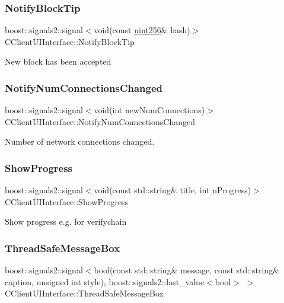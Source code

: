 \subsubsection{\texorpdfstring{Notify\+Block\+Tip}{NotifyBlockTip}}
{\footnotesize\ttfamily boost\+::signals2\+::signal$<$void(const \mbox{\hyperlink{classuint256}{uint256}}\& hash)$>$ C\+Client\+U\+I\+Interface\+::\+Notify\+Block\+Tip}

New block has been accepted \mbox{\label{class_c_client_u_i_interface_a6b0c2f21bb930d5a4e34244af6a0a3b5}} 
\subsubsection{\texorpdfstring{Notify\+Num\+Connections\+Changed}{NotifyNumConnectionsChanged}}
{\footnotesize\ttfamily boost\+::signals2\+::signal$<$void(int new\+Num\+Connections)$>$ C\+Client\+U\+I\+Interface\+::\+Notify\+Num\+Connections\+Changed}

Number of network connections changed. \mbox{\label{class_c_client_u_i_interface_a2190089fbdfd78221c4b74ca98e96e01}} 
\subsubsection{\texorpdfstring{Show\+Progress}{ShowProgress}}
{\footnotesize\ttfamily boost\+::signals2\+::signal$<$void(const std\+::string\& title, int n\+Progress)$>$ C\+Client\+U\+I\+Interface\+::\+Show\+Progress}

Show progress e.\+g. for verifychain \mbox{\label{class_c_client_u_i_interface_a93e77ea8828d8d960348cf4648b7f374}} 
\subsubsection{\texorpdfstring{Thread\+Safe\+Message\+Box}{ThreadSafeMessageBox}}
{\footnotesize\ttfamily boost\+::signals2\+::signal$<$bool(const std\+::string\& message, const std\+::string\& caption, unsigned int style), boost\+::signals2\+::last\+\_\+value$<$bool$>$ $>$ C\+Client\+U\+I\+Interface\+::\+Thread\+Safe\+Message\+Box}

